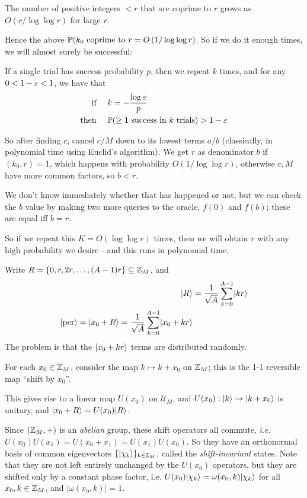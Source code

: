 \documentclass[]{article}
\renewcommand{\it}[1]{\textit{#1}}
\newcommand{\U}{\mathcal{U}}
\newcommand{\per}{\ket{\textrm{per}}}
\begin{document}
\begin{theorem*}
The number of positive integers $<r$ that are coprime to $r$ grows as $O\left(r/\log\log r\right)$ for large $r$.
\end{theorem*}
Hence the above $\P(k_0 \textrm{ coprime to }r = O\left(1/\log\log r\right)$. So if we do it enough times, we will almost surely be successful:
	
\begin{remark*}
If a single trial has success probability $p$, then we repeat $k$ times, and for any $0 < 1 - \eps < 1$, we have that
\begin{align*}
	\textrm{if }&\quad k= -\frac{\log \eps}{p}\\
	\textrm{then }&\quad\P(\ge 1 \textrm{ success in }k \textrm{ trials}) > 1 - \eps
\end{align*}
\end{remark*}
So after finding $c$, cancel $c/M$ down to its lowest terms $a/b$ (classically, in polynomial time using Euclid's algorithm). We get $r$ as denominator $b$ if $(k_0,r) = 1$, which happens with probability $O(1/\log\log r)$, otherwise $c,M$ have more common factors, so $b < r$.

We don't know immediately whether that has happened or not, but we can check the $b$ value by making two more queries to the oracle, $f(0)$ and $f(b)$; these are equal iff $b = r$.

So if we repeat this $K = O(\log\log r)$ times, then we will obtain $r$ with any high probability we desire - and this runs in polynomial time.


Write $R = \{0,r,2r,\dots,(A-1)r\}\subset \Z_M$, and
\begin{align*}
\ket{R} &= \frac{1}{\sqrt{A}}\sum_{k=0}^{A-1}\ket{kr}\\
\per = \ket{x_0+R} = \frac{1}{\sqrt{A}}\sum_{k=0}^{A-1}\ket{x_0+kr}
\end{align*}
The problem is that the $\ket{x_0+kr}$ terms are distributed randomly.

For each $x_0\in\Z_M$, consider the map $k\mapsto k+x_0$ on $\Z_M$; this is the 1-1 reversible map ``shift by $x_0$''.

This gives rise to a linear map $U(x_0)$ on $\U_M$, and $U(x_0):\ket{k}\ra\ket{k+x_0}$ is unitary, and $\ket{x_0+R} = U(x_0)\ket{R}$.

Since $(\Z_M,+)$ is an \it{abelian} group, these shift operators all commute, \it{i.e.} $U(x_0)U(x_1) = U(x_0+x_1) = U(x_1)U(x_0)$. So they have an orthonormal basis of common eigenvectors $\{\ket{\chi_k}\}_{k\in\Z_M}$, called the \it{shift-invariant} states. Note that they are not left entirely unchanged by the $U(x_0)$ operators, but they are shifted only by a constant phase factor, \textrm{i.e.} $U(x_0)\ket{\chi_k} = \omega(x_0,k)\ket{\chi_k}$ for all $x_0,k\in\Z_M$, and $|\omega(x_0,k)| = 1$.
\end{document}

